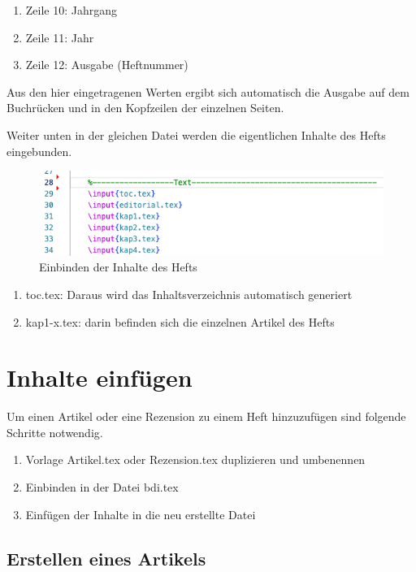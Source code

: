 \documentclass{article}
\begin{document}
\begin{enumerate}
    \item Zeile 10: Jahrgang
    \item Zeile 11: Jahr
    \item Zeile 12: Ausgabe (Heftnummer)
\end{enumerate}

Aus den hier eingetragenen Werten ergibt sich automatisch die Ausgabe auf dem Buchrücken und in den Kopfzeilen der einzelnen Seiten. 

Weiter unten in der gleichen Datei werden die eigentlichen Inhalte des Hefts eingebunden.

\begin{figure}
    \centering
    \caption{Einbinden der Inhalte des Hefts}
    \includegraphics[scale=0.8]{Inhaltseinbindung.png}
\end{figure}

\begin{enumerate}
    \item toc.tex: Daraus wird das Inhaltsverzeichnis automatisch generiert
    \item kap1-x.tex: darin befinden sich die einzelnen Artikel des Hefts
\end{enumerate}

\section{Inhalte einfügen}

Um einen Artikel oder eine Rezension zu einem Heft hinzuzufügen sind folgende Schritte notwendig.

\begin{enumerate}
    \item Vorlage Artikel.tex oder Rezension.tex duplizieren und umbenennen
    \item Einbinden in der Datei bdi.tex
    \item Einfügen der Inhalte in die neu erstellte Datei
\end{enumerate}

\subsection{Erstellen eines Artikels}
\end{document}
